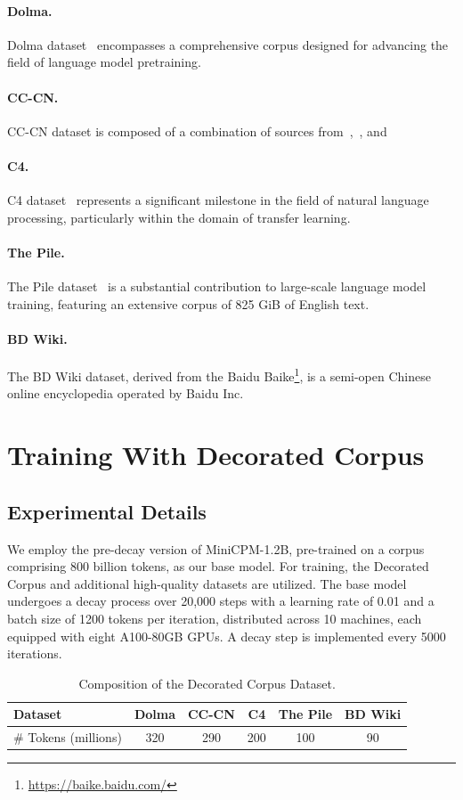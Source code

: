 \documentclass[11pt]{article}
\begin{document}
\paragraph{Dolma.}
Dolma dataset~\citep{soldaini2024dolma} encompasses a comprehensive corpus designed for advancing the field of language model pretraining.
\paragraph{CC-CN.} CC-CN dataset is composed of a combination of sources from~\citep{CLUECorpus2020},~\citep{wei2023skywork}, and~\citep{wu2021yuan}
\paragraph{C4.} C4 dataset~\citep{raffel2020exploring} represents a significant milestone in the field of natural language processing, particularly within the domain of transfer learning.
\paragraph{The Pile.} The Pile dataset~\citep{gao2020pile} is a substantial contribution to large-scale language model training, featuring an extensive corpus of 825 GiB of English text.
\paragraph{BD Wiki.} The BD Wiki dataset, derived from the Baidu Baike\footnote{\url{https://baike.baidu.com/}}, is a semi-open Chinese online encyclopedia operated by Baidu Inc.

\section{Training With Decorated Corpus}
\label{evaluation}
\subsection{Experimental Details}
We employ the pre-decay version of MiniCPM-1.2B, pre-trained on a corpus comprising 800 billion tokens, as our base model. For training, the Decorated Corpus and additional high-quality datasets are utilized. The base model undergoes a decay process over 20,000 steps with a learning rate of 0.01 and a batch size of 1200 tokens per iteration, distributed across 10 machines, each equipped with eight A100-80GB GPUs. A decay step is implemented every 5000 iterations.
\begin{table}[ht]
  \centering
  \begin{tabular}{lccccc}
    \toprule
    \textbf{Dataset} & \textbf{Dolma} & \textbf{CC-CN} & \textbf{C4} & \textbf{The Pile} & \textbf{BD Wiki} \\
    \midrule
    \# Tokens (millions) & 320 & 290 & 200 & 100 & 90 \\
    \bottomrule
  \end{tabular}
  \caption{\label{tab:decorated_corpus}
    Composition of the Decorated Corpus Dataset.
  }
\end{table}
\end{document}
